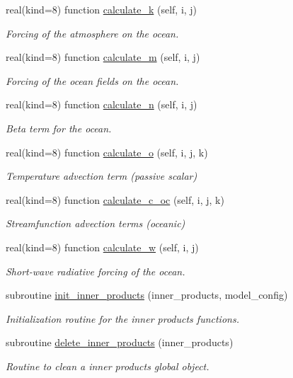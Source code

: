 \begin{DoxyCompactItemize}
real(kind=8) function \hyperlink{namespaceinprod__analytic_a25c4aee768622508f24ea32ce9258618}{calculate\+\_\+k} (self, i, j)
\begin{DoxyCompactList}\small\item\em Forcing of the atmosphere on the ocean. \end{DoxyCompactList}\item 
real(kind=8) function \hyperlink{namespaceinprod__analytic_a04bacbacbd212ad46418336455c30fb4}{calculate\+\_\+m} (self, i, j)
\begin{DoxyCompactList}\small\item\em Forcing of the ocean fields on the ocean. \end{DoxyCompactList}\item 
real(kind=8) function \hyperlink{namespaceinprod__analytic_a83197d7b47ce78f414762a1d8fe410bf}{calculate\+\_\+n} (self, i, j)
\begin{DoxyCompactList}\small\item\em Beta term for the ocean. \end{DoxyCompactList}\item 
real(kind=8) function \hyperlink{namespaceinprod__analytic_ad8d3f48abb40cd01056bbb15c4c52be6}{calculate\+\_\+o} (self, i, j, k)
\begin{DoxyCompactList}\small\item\em Temperature advection term (passive scalar) \end{DoxyCompactList}\item 
real(kind=8) function \hyperlink{namespaceinprod__analytic_a4040642a04e9a16f23b51fcff998c513}{calculate\+\_\+c\+\_\+oc} (self, i, j, k)
\begin{DoxyCompactList}\small\item\em Streamfunction advection terms (oceanic) \end{DoxyCompactList}\item 
real(kind=8) function \hyperlink{namespaceinprod__analytic_a2d96b61d6e18b90638227c6f82042281}{calculate\+\_\+w} (self, i, j)
\begin{DoxyCompactList}\small\item\em Short-\/wave radiative forcing of the ocean. \end{DoxyCompactList}\item 
subroutine \hyperlink{namespaceinprod__analytic_ad2e5c28272f877bf96af8ee821004386}{init\+\_\+inner\+\_\+products} (inner\+\_\+products, model\+\_\+config)
\begin{DoxyCompactList}\small\item\em Initialization routine for the inner products functions. \end{DoxyCompactList}\item 
subroutine \hyperlink{namespaceinprod__analytic_a1319e98f839daff8d840469929c349fb}{delete\+\_\+inner\+\_\+products} (inner\+\_\+products)
\begin{DoxyCompactList}\small\item\em Routine to clean a inner products global object. \end{DoxyCompactList}\end{DoxyCompactItemize}


